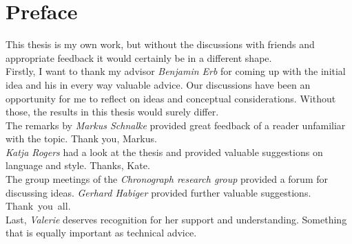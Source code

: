 \thispagestyle{page_number_bottom_center}
\section*{Preface}

This thesis is my own work, but without the discussions with friends and
appropriate feedback it would certainly be in a different shape.\\

\noindent{}Firstly, I want to thank my advisor \emph{Benjamin Erb} for 
coming up with the initial idea and his in every way valuable advice. 
Our discussions have been an opportunity for me to reflect on ideas and 
conceptual considerations. Without those, the results in this thesis would 
surely differ.\\ 

\noindent{}The remarks by \emph{Markus Schnalke} provided great feedback of 
a reader unfamiliar with the topic. Thank you, Markus.\\ 

\noindent{}\emph{Katja Rogers} had a look at the thesis and provided valuable 
suggestions on language and style. Thanks, Kate.\\ 

\noindent{}The group meetings of the \emph{Chronograph research group} 
provided a forum for discussing ideas. \emph{Gerhard Habiger} provided further 
valuable suggestions. Thank~you~all.\\ 

\noindent{}Last, \emph{Valerie} deserves recognition for her support and 
understanding. Something that is equally important as technical advice.
